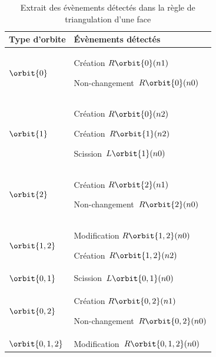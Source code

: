 \begin{table}[htbp!]
	\caption{\label{tab:formalisation-evenements-regle-jerboa-tableau-detection-triangulation}
		Extrait des évènements détectés dans la règle de triangulation d'une face}
	\centering
	\begin{tabular}{|p{}|p{}|}
		\hline
		\centering Type d'orbite   & Évènements détectés               \\
		\hline
		\centering $\orbit{0}$     & Création $R\orbit{0}(n1)$
		\par Non-changement~$R\orbit{0}(n0)$                           \\
		\hline
		\centering $\orbit{1}$     & Création $R\orbit{0}(n2)$
		\par Création~$R\orbit{1}(n2)$
		\par Scission~$L\orbit{1}(n0)$                                 \\
		\hline
		\centering $\orbit{2}$     & Création $R\orbit{2}(n1)$
		\par Non-changement~$R\orbit{2}(n0)$                           \\
		\hline
		\centering $\orbit{1,2}$   & Modification $R\orbit{1,2}(n0)$
		\par Création~$R\orbit{1,2}(n2)$                               \\
		\hline
		\centering $\orbit{0,1}$   & Scission~$L\orbit{0,1}(n0)$       \\
		\hline
		\centering $\orbit{0,2}$   & Création $R\orbit{0,2}(n1)$
		\par Non-changement~$R\orbit{0,2}(n0)$                         \\
		\hline
		\centering $\orbit{0,1,2}$ & Modification~$R\orbit{0,1,2}(n0)$ \\
		\hline
	\end{tabular}
	\normalsize

\end{table}


